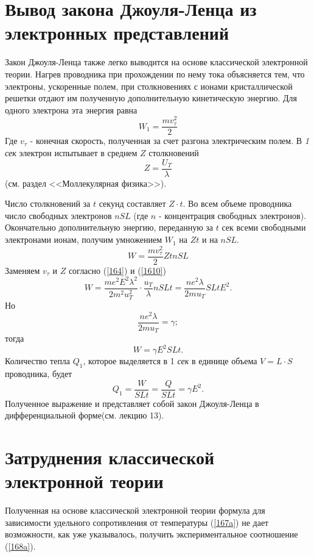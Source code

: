 \documentclass[a4paper,10pt]{book}
\begin{document}
\section{Вывод закона Джоуля-Ленца из электронных представлений}
Закон Джоуля-Ленца также легко выводится на основе классической электронной теории. Нагрев проводника при прохождении по нему тока объясняется тем, 
что электроны, ускоренные полем, при столкновениях с ионами кристаллической решетки отдают им полученную дополнительную кинетическую энергию.
Для одного электрона эта энергия равна
\begin{equation}\label{169}
 W_1 = \frac{mv_\tau^2}{2}
\end{equation}
Где $v_\tau$ - конечная скорость, полученная за счет разгона электрическим полем. В \emph{1 сек} электрон испытывает в среднем $Z$ столкновений
\begin{equation}\label{1610}
 Z = \frac{U_T}{\lambda}
\end{equation}
(см. раздел <<Моллекулярная физика>>).

Число столкновений за $t$ секунд составляет $Z\cdot t$. Во всем объеме проводника число свободных электронов $nSL$ (где $n$ - концентрация 
свободных электронов). Окончательно дополнительную энергию, переданную за $t$ сек всеми свободными электронами ионам, получим умножением 
$W_1$ на $Zt$ и на $nSL$.
\begin{equation}\label{1611}
 W = \frac{mv^2_\tau}{2}ZtnSL
\end{equation}
Заменяем $v_\tau$ и $Z$ согласно (\ref{164}) и (\ref{1610})
\begin{equation*}
 W = \frac{me^2E^2\lambda^2}{2m^2u_T^2}\cdot\frac{u_T}{\lambda}nSLt = \frac{ne^2\lambda}{2mu_T}SLtE^2.
\end{equation*}
Но 
\begin{equation*}
 \frac{ne^2\lambda}{2mu_T} = \gamma;
\end{equation*}
тогда
\begin{equation}\label{1612}
 W = \gamma E^2SLt.
\end{equation}
Количество тепла $Q_1$, которое выделяется в 1 \emph{сек} в единице объема $V = L\cdot S$ проводника, будет
\begin{equation}\label{1613}
 Q_1 = \frac{W}{SLt} = \frac{Q}{SLt} = \gamma E^2.
\end{equation}
Полученное выражение и представляет собой закон Джоуля-Ленца в дифференциальной форме(см. лекцию 13).
\section{Затруднения классической электронной теории}
Полученная на основе классической электронной теории формула для зависимости удельного сопротивления от температуры (\ref{167a}) не дает 
возможности, как уже указывалось, получить экспериментальное соотношение (\ref{168a}).
\end{document}
